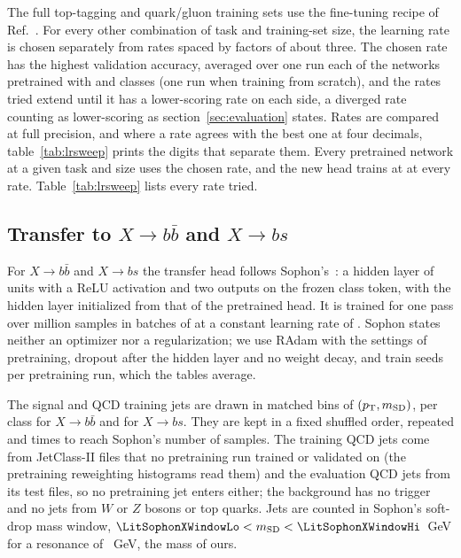 The full top-tagging and quark/gluon training sets use the fine-tuning recipe of Ref.~\cite{part}. For every
other combination of task and training-set size, the learning rate is chosen separately from rates spaced by
factors of about three. The chosen rate has the highest validation accuracy, averaged over one run each of the
networks pretrained with \Kfull{} and \Kcoarse{} classes (one run when training from scratch), and the rates
tried extend until it has a lower-scoring rate on each side, a diverged rate counting as lower-scoring as
section~\ref{sec:evaluation} states. Rates are compared at full precision, and where a rate agrees with the best one at four decimals, table~\ref{tab:lrsweep} prints the digits that separate them. Every pretrained network at a given task and size uses the chosen rate, and the new head
trains at \FtHeadCap{} at every rate. Table~\ref{tab:lrsweep} lists every rate tried.


\subsection{Transfer to $X\to b\bar b$ and $X\to bs$}\label{sec:app-xbx}

For $X\to b\bar b$ and $X\to bs$ the transfer head follows Sophon's~\cite[App.~B.5]{sophon}: a
hidden layer of \DesignHeadHidden{} units with a ReLU activation and two outputs on the frozen class
token, with the hidden layer initialized from that of the pretrained head. It is trained for one pass
over \LitSophonTransferSamplesMillion{} million samples in batches of \LitSophonTransferBatch{} at a
constant learning rate of \LitSophonTransferLr. Sophon states neither an optimizer nor a
regularization; we use RAdam with the settings of pretraining, dropout after the hidden layer and no
weight decay, and train \MlstXbxHeadSeedsWord{} seeds per pretraining run, which the tables average.

The signal and QCD training jets are drawn in matched bins of $(p_{\mathrm{T}}, m_{\mathrm{SD}})$,
\XbbNTrainPerClass{} per class for $X\to b\bar b$ and \XbsNTrainPerClass{} for $X\to bs$. They are kept
in a fixed shuffled order, repeated \XbbRepetition{} and \XbsRepetition{} times to reach Sophon's number
of samples. The training QCD jets come from JetClass-II files that no pretraining run trained or validated on (the pretraining
reweighting histograms read them) and the evaluation QCD jets
from its test files, so no pretraining jet enters either; the background has no trigger and no jets from $W$ or
$Z$ bosons or top quarks. Jets are counted in Sophon's soft-drop mass window,
$\LitSophonXWindowLo < \msd < \LitSophonXWindowHi$~GeV for a resonance of \LitSophonXMass~GeV, the mass
of ours.

